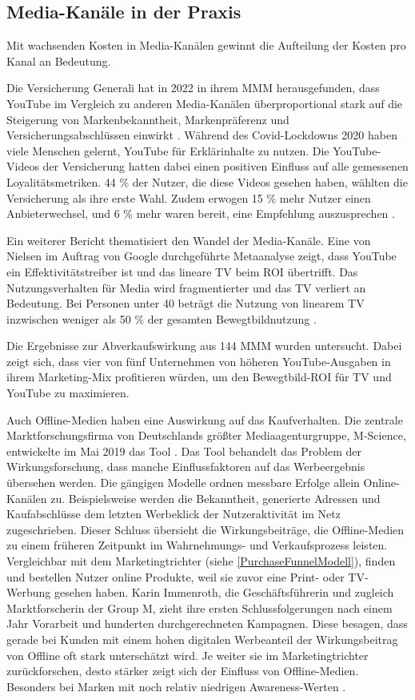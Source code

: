 \subsection{Media-Kanäle in der Praxis}
\label{MediaKanäleInDerPraxis}
Mit wachsenden Kosten in Media-Kanälen gewinnt die Aufteilung der Kosten pro Kanal an Bedeutung. \par
Die Versicherung Generali hat in 2022 in ihrem \ac{MMM} herausgefunden, dass YouTube im Vergleich zu anderen Media-Kanälen überproportional stark auf die Steigerung von Markenbekanntheit, Markenpräferenz und Versicherungsabschlüssen einwirkt \cite{DasZusammenspielKundenloyalität2022}. Während des Covid-Lockdowns 2020 haben viele Menschen gelernt, YouTube für Erklärinhalte zu nutzen. Die YouTube-Videos der Versicherung hatten dabei einen positiven Einfluss auf alle gemessenen Loyalitätsmetriken. 44 \% der Nutzer, die diese Videos gesehen haben, wählten die Versicherung als ihre erste Wahl. Zudem erwogen 15 \% mehr Nutzer einen Anbieterwechsel, und 6 \% mehr waren bereit, eine Empfehlung auszusprechen \cite{DasZusammenspielKundenloyalität2022}. \par
Ein weiterer Bericht thematisiert den Wandel der Media-Kanäle. Eine von Nielsen im Auftrag von Google durchgeführte Metaanalyse zeigt, dass YouTube ein Effektivitätstreiber ist und das lineare TV beim \ac{ROI} übertrifft. Das Nutzungsverhalten für Media wird fragmentierter und das TV verliert an Bedeutung. Bei Personen unter 40 beträgt die Nutzung von linearem TV inzwischen weniger als 50 \% der gesamten Bewegtbildnutzung \cite{237097}.\par
Die Ergebnisse zur Abverkaufswirkung aus 144 \ac{MMM} wurden untersucht. Dabei zeigt sich, dass vier von fünf Unternehmen von höheren YouTube-Ausgaben in ihrem Marketing-Mix profitieren würden, um den Bewegtbild-ROI für TV und YouTube zu maximieren\cite{237097}. \par
Auch Offline-Medien haben eine Auswirkung auf das Kaufverhalten. Die zentrale Marktforschungsfirma von Deutschlands größter Mediaagenturgruppe, M-Science, entwickelte im Mai 2019 das Tool . Das Tool behandelt das Problem der Wirkungsforschung, dass manche Einflussfaktoren auf das Werbeergebnis übersehen werden. Die gängigen Modelle ordnen messbare Erfolge allein Online-Kanälen zu. Beispielsweise werden die Bekanntheit, generierte Adressen und Kaufabschlüsse dem letzten Werbeklick der Nutzeraktivität im Netz zugeschrieben. Dieser Schluss übersieht die Wirkungsbeiträge, die Offline-Medien zu einem früheren Zeitpunkt im Wahrnehmungs- und Verkaufsprozess leisten. Vergleichbar mit dem Marketingtrichter (siehe \autoref{PurchaseFunnelModell}), finden und bestellen Nutzer online Produkte, weil sie zuvor eine Print- oder TV-Werbung gesehen haben. Karin Immenroth, die Geschäftsführerin und zugleich Marktforscherin der Group M, zieht ihre ersten Schlussfolgerungen nach einem Jahr Vorarbeit und hunderten durchgerechneten Kampagnen. Diese besagen, dass gerade bei Kunden mit einem hohen digitalen Werbeanteil der Wirkungsbeitrag von Offline oft stark unterschätzt wird. Je weiter sie im Marketingtrichter zurückforschen, desto stärker zeigt sich der Einfluss von Offline-Medien. Besonders bei Marken mit noch relativ niedrigen Awareness-Werten \cite[S. 4]{20190411492848}.
